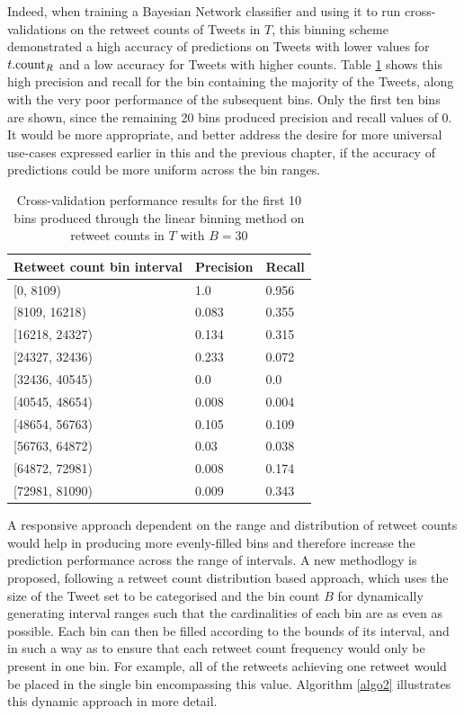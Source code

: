 Indeed, when training a Bayesian Network classifier and using it to run cross-validations on the retweet counts of Tweets in $T$, this binning scheme demonstrated a high accuracy of predictions on Tweets with lower values for $t.\textrm{count}_R$ and a low accuracy for Tweets with higher counts. Table \ref{table:linear_bin_performance} shows this high precision and recall for the bin containing the majority of the Tweets, along with the very poor performance of the subsequent bins. Only the first ten bins are shown, since the remaining 20 bins produced precision and recall values of 0. It would be more appropriate, and better address the desire for more universal use-cases expressed earlier in this and the previous chapter, if the accuracy of predictions could be more uniform across the bin ranges.

\begin{table}[h]\footnotesize
\begin{center}
\begin{tabular}{ l | l | l }
	Retweet count bin interval	& Precision & Recall \\
	\hline
	\hline 
    {[0, 8109)}        &   1.0     &   0.956\\
    {[8109, 16218)}    &   0.083   &   0.355\\
    {[16218, 24327)}  &   0.134   &   0.315\\
    {[24327, 32436)}  &   0.233   &   0.072\\
    {[32436, 40545)}  &   0.0       &   0.0\\ 
    {[40545, 48654)}  &   0.008   &   0.004\\
    {[48654, 56763)}  &   0.105   &   0.109\\
    {[56763, 64872)}  &   0.03    &   0.038\\
    {[64872, 72981)}  &   0.008   &   0.174\\
    {[72981, 81090)}  &   0.009   &   0.343\\
    \hline  
\end{tabular}
\end{center}
\caption{Cross-validation performance results for the first 10 bins produced through the linear binning method on retweet counts in $T$ with $B=30$}
\label{table:linear_bin_performance}
\end{table}

A responsive approach dependent on the range and distribution of retweet counts would help in producing more evenly-filled bins and therefore increase the prediction performance across the range of intervals. A new methodlogy is proposed, following a retweet count distribution based approach, which uses the size of the Tweet set to be categorised and the bin count $B$ for dynamically generating interval ranges such that the cardinalities of each bin are as even as possible. Each bin can then be filled according to the bounds of its interval, and in such a way as to ensure that each retweet count frequency would only be present in one bin. For example, all of the retweets achieving one retweet would be placed in the single bin encompassing this value. Algorithm \ref{algo2} illustrates this dynamic approach in more detail.

